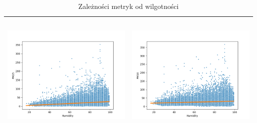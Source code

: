 \documentclass[18pt, letterpaper]{article}
\begin{document}
\begin{table}[H]
\begin{tabular}{|c|c|}
\includegraphics[width=80mm,height=60mm]{visualisations/corr_plots/HumidityxPM25_scatter.png}  & \includegraphics[width=80mm,height=60mm]{visualisations/corr_plots/HumidityxPM10_scatter.png} \\ \hline
\end{tabular}
\caption{Zależności metryk od wilgotności}
\label{table:humidity}
\end{table}
\end{document}
